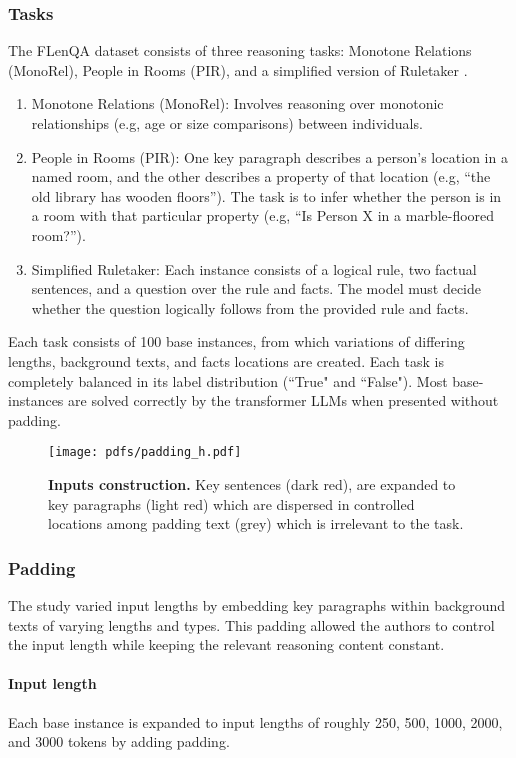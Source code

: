 \documentclass[11pt]{article}
\begin{document}
\subsubsection{Tasks}
The FLenQA dataset consists of three reasoning tasks: Monotone Relations (MonoRel), People in Rooms (PIR), and a simplified version of Ruletaker \citep{clark2021transformers}.
\begin{enumerate}
    \item {Monotone Relations (MonoRel)}: Involves reasoning over monotonic relationships (e.g, age or size comparisons) between individuals.
    \item {People in Rooms (PIR)}: One key paragraph describes a person’s location in a named room, and the other describes a property of that location (e.g, “the old library has wooden floors”).
    The task is to infer whether the person is in a room with that particular property (e.g, “Is Person X in a marble-floored room?”).
    \item {Simplified Ruletaker}: Each instance consists of a logical rule, two factual sentences, and a question over the rule and facts. The model must decide whether the question logically follows from the provided rule and facts.
\end{enumerate}
 Each task consists of 100 base instances, from which variations of differing lengths, background texts, and facts locations are created. Each task is completely balanced in its label distribution (``True" and ``False"). Most base-instances are solved correctly by the transformer LLMs when presented without padding.

\begin{figure}[t]
    \centering
    \texttt{[image: pdfs/padding\_h.pdf]}

    \caption{\textbf{Inputs construction.} Key sentences (dark red), are expanded to key paragraphs (light red) which are dispersed in controlled locations among padding text (grey) which is irrelevant to the task.}
    \label{fig:padding}
\end{figure}
\subsubsection{Padding}
The study varied input lengths by embedding key paragraphs within background texts of varying lengths and types. This padding allowed the authors to control the input length while keeping the relevant reasoning content constant.
\paragraph{Input length} Each base instance is expanded to input lengths of roughly 250, 500, 1000, 2000, and 3000 tokens by adding padding.
\end{document}
